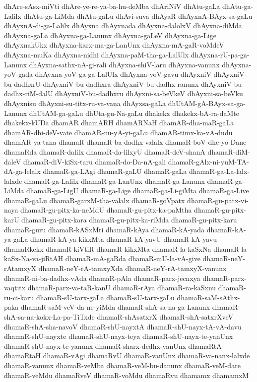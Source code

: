{dhAre-sAsx-miVti
dhAre-ye-re-ya-ba-hu-deMba
dhAriNiV
dhAtu-gaLa
dhAtu-ga-Lalilx
dhAtu-ga-LiMda
dhAtu-gaLu
dhAvi-suva
dhAyaR
dhAyxnA-BAyx-sa-gaLu
dhAyxnA-di-ga-Lalilx
dhAyxna
dhAyxnada
dhAyxna-dalolxV
dhAyxna-diMda
dhAyxna-gaLa
dhAyxna-ga-Lanunx
dhAyxna-gaLeV
dhAyxna-ga-Lige
dhAyxnakUkx
dhAyxna-karx-ma-ga-LanUnx
dhAyxna-mA-gaR-voMdeV
dhAyxna-muKa
dhAyxna-nidhi
dhAyxna-paM-tha-ga-LalUlx
dhAyxna-rU-pa-ga-Lanunx
dhAyxna-sathx-nA-gi-rali
dhAyxna-shiV-laru
dhAyxna-vanunx
dhAyxna-yoV-gada
dhAyxna-yoV-ga-ga-LalUlx
dhAyxna-yoV-gavu
dhAyxniV
dhAyxniV-bu-dadhxrU
dhAyxniV-bu-dadhxra
dhAyxniV-bu-dadhx-ranunx
dhAyxniV-bu-dadhx-riM-dalU
dhAyxniV-bu-dadhxru
dhAyxni-sa-beVkeV
dhAyxni-sa-beVku
dhAyxnisu
dhAyxni-su-titx-ru-va-vana
dhAyxsa-gaLa
dhUtAM-gA-BAyx-sa-ga-Lanunx
dhUtAM-ga-gaLu
dhUta-gu-Na-gaLu
dhakekx
dhakekx-bA-ra-daMte
dhakekx-kUDa
dhamAR
dhamARH
dhamARNaH
dhamAR-dha-maR-gaLa
dhamAR-dhi-deV-vate
dhamAR-nu-yA-yi-gaLu
dhamAR-timx-ka-vA-dudu
dhamAR-ya-tana
dhamaR
dhamaR-ba-dadhx-valalx
dhamaR-boV-dhe-yo-Dane
dhamaRda
dhamaR-dalilx
dhamaR-da-lilxyU
dhamaR-deV-shanA
dhamaR-diM-daleV
dhamaR-diV-kiSx-taru
dhamaR-do-Da-nA-gali
dhamaR-gAlx-ni-yuM-TA-dA-ga-lelalx
dhamaR-ga-LAgi
dhamaR-gaLU
dhamaR-gaLa
dhamaR-ga-La-lalx-lalxde
dhamaR-ga-Lalilx
dhamaR-ga-LanUnx
dhamaR-ga-Lanunx
dhamaR-ga-LiMda
dhamaR-ga-LigU
dhamaR-ga-Lige
dhamaR-ga-Li-giMta
dhamaR-ga-Live
dhamaR-gaLu
dhamaR-garxM-tha-valalx
dhamaR-goVpatx
dhamaR-gu-patx-vi-naya
dhamaR-gu-pitx-ka-neMdU
dhamaR-gu-pitx-ka-paMtha
dhamaR-gu-pitx-karU
dhamaR-gu-pitx-kara
dhamaR-gu-pitx-ka-riMda
dhamaR-gu-pitx-karu
dhamaR-guru
dhamaR-kASxMti
dhamaR-kAya
dhamaR-kA-yada
dhamaR-kA-ya-gaLa
dhamaR-kA-ya-kikxMta
dhamaR-kA-yavU
dhamaR-kA-yavu
dhamaRkekx
dhamaR-kiVtiR
dhamaR-kikxMta
dhamaR-la-kaSxNa
dhamaR-la-kaSx-Na-va-jiRtAH
dhamaR-mA-gaRda
dhamaR-mU-la-vA-give
dhamaR-neY-rAtamxyX
dhamaR-neY-rA-tamxyXda
dhamaR-neY-rA-tamxyX-vanunx
dhamaR-ni-ba-dadhx-vAda
dhamaR-pAla
dhamaR-parx-jecnxya
dhamaR-parx-vaqtitx
dhamaR-parx-va-taR-kanU
dhamaR-rAya
dhamaR-ra-kaSxnu
dhamaR-ru-ci-karu
dhamaR-sU-tarx-gaLa
dhamaR-sU-tarx-gaLu
dhamaR-saM-sAthx-paka
dhamaR-saM-veV-da-ne-yiMda
dhamaR-shA-sa-na-ga-Lanunx
dhamaR-shA-sa-na-kokx-La-pa-TiTxde
dhamaR-shAsatxrX
dhamaR-shA-satxrXveV
dhamaR-shA-sha-navoV
dhamaR-shU-nayxtA
dhamaR-shU-nayx-tA-vA-davu
dhamaR-shU-nayxte
dhamaR-shU-nayx-teya
dhamaR-shU-nayx-te-yanUnx
dhamaR-shU-nayx-te-yanunx
dhamaR-sharx-dedhx-yanUnx
dhamaRtA
dhamaRtaH
dhamaR-vAgi
dhamaRvU
dhamaR-vanUnx
dhamaR-va-nanx-lalxde
dhamaR-vanunx
dhamaR-veMba
dhamaR-veM-bu-danunx
dhamaR-veM-dare
dhamaR-veMdu
dhamaRveV
dhamaR-voMdu
dhamaRvu
dhamamx
dhamamxM
}
